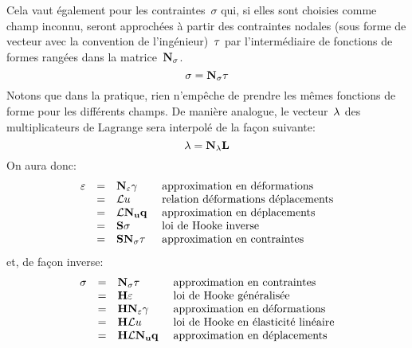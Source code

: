 Cela vaut également pour les contraintes~$\sigma$ qui, si elles sont choisies comme champ inconnu, seront approchées à partir des contraintes nodales (sous forme de vecteur avec la convention de l'ingénieur)~$\VV{\tau}$ par l'intermédiaire de fonctions de formes rangées dans la matrice~$\MM{N_\sigma}$.
\begin{equation}
  \sigma = \MM{N_\sigma}\VV{\tau}
\end{equation}
Notons que dans la pratique, rien n'empêche de prendre les mêmes fonctions de forme pour les différents champs.
\medskipvm
De manière analogue, le vecteur~$\VV{\lambda}$ des multiplicateurs de Lagrange sera interpolé de la façon suivante:
\begin{equation}
  \VV{\lambda}=\MM{N_\lambda}\VV{L}
\end{equation}
\medskipvm
On aura donc:
\begin{equation}
  \begin{array}{rcll}
  \varepsilon &=& \MM{N_\varepsilon}\VV{\gamma}
           &\text{ approximation en déformations}\\
          &=& \MM{\cL}u
           &\text{ relation déformations déplacements}\\
          &=& \MM{\cL}\MM{N_u}\VV{q}
           &\text{ approximation en déplacements}\\
          &=& \MM{S}\sigma
           &\text{ loi de Hooke inverse}\\
          &=& \MM{S}\MM{N_\sigma}\VV{\tau}
           &\text{ approximation en contraintes}
  \end{array}
\end{equation}
et, de façon inverse:
\begin{equation}
  \begin{array}{rcll}
  \sigma &=& \MM{N_\sigma}\VV{\tau}
           &\text{ approximation en contraintes}\\
          &=& \MM{H}\varepsilon
           &\text{ loi de Hooke généralisée}\\
          &=& \MM{H}\MM{N_\varepsilon}\VV{\gamma}
           &\text{ approximation en déformations}\\
          &=& \MM{H}\MM{\cL}u
           &\text{ loi de Hooke en élasticité linéaire}\\
          &=& \MM{H}\MM{\cL}\MM{N_u}\VV{q}
           &\text{ approximation en déplacements}
  \end{array}
\end{equation}
